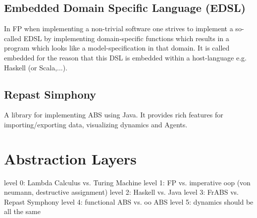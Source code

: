 \documentclass[oneside]{book}
\begin{document}
\section*{Embedded Domain Specific Language (EDSL)}
In FP when implementing a non-trivial software one strives to implement a so-called EDSL by implementing domain-specific functions which results in a program which looks like a model-specification in that domain. It is called embedded for the reason that this DSL is embedded within a host-language e.g. Haskell (or Scala,...).

\section*{Repast Simphony}
A library for implementing ABS using Java. It provides rich features for importing/exporting data, visualizing dynamics and Agents.

\begin{landscape}


\end{landscape}

\chapter{Abstraction Layers}
level 0: Lambda Calculus vs. Turing Machine
level 1: FP vs. imperative oop (von neumann, destructive assignment)
level 2: Haskell vs. Java
level 3: FrABS vs. Repast Symphony
level 4: functional ABS vs. oo ABS
level 5: dynamics should be all the same
\end{document}
